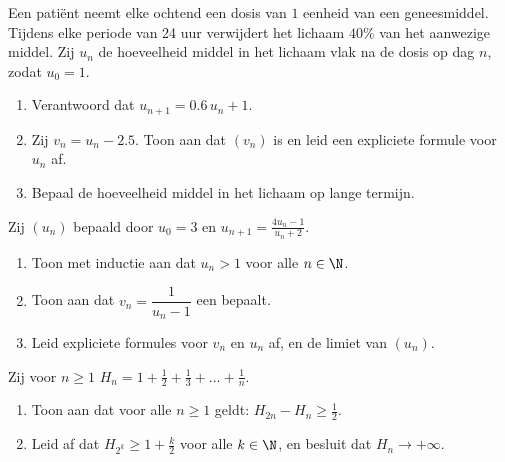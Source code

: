 \begin{exercise}[$\star\star$]\label{exo:g12:seq:7}
Een patiënt neemt elke ochtend een dosis van $1$ eenheid van een geneesmiddel.
Tijdens elke periode van 24 uur verwijdert het lichaam $40\%$ van het
aanwezige middel. Zij $u_n$ de hoeveelheid middel in het lichaam vlak na de
dosis op dag $n$, zodat $u_0 = 1$.
\begin{enumerate}
  \item Verantwoord dat $u_{n+1} = 0.6\,u_n + 1$.
  \item Zij $v_n = u_n - 2.5$. Toon aan dat $(v_n)$  is en leid een
        expliciete formule voor $u_n$ af.
  \item Bepaal de hoeveelheid middel in het lichaam op lange termijn.
\end{enumerate}
\end{exercise}

\begin{exercise}[$\star\star$]\label{exo:g12:seq:8}
Zij $(u_n)$ bepaald door $u_0 = 3$ en $u_{n+1} = \frac{4u_n - 1}{u_n + 2}$.
\begin{enumerate}
  \item Toon met inductie aan dat $u_n > 1$ voor alle $n \in \N$.
  \item Toon aan dat $v_n = \dfrac{1}{u_n - 1}$ een  bepaalt.
  \item Leid expliciete formules voor $v_n$ en $u_n$ af, en de limiet van
        $(u_n)$.
\end{enumerate}
\end{exercise}

\begin{exercise}[$\star\star\star$]\label{exo:g12:seq:9}
Zij voor $n \geq 1$
$H_n = 1 + \frac{1}{2} + \frac{1}{3} + \dots + \frac{1}{n}$.
\begin{enumerate}
  \item Toon aan dat voor alle $n \geq 1$ geldt: $H_{2n} - H_n \geq
        \frac{1}{2}$.
  \item Leid af dat $H_{2^k} \geq 1 + \frac{k}{2}$ voor alle $k \in \N$, en
        besluit dat $H_n \to +\infty$.
\end{enumerate}
\end{exercise}

